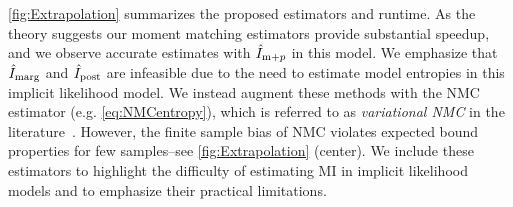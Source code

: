 \FIG\ref{fig:Extrapolation} summarizes the proposed estimators and
runtime.  As the theory suggests our moment matching estimators
provide substantial speedup, and we observe accurate estimates with
$\hat{I}_{\text{m}+p}$ in this model.  We emphasize that $\hat{I}_{\text{marg}}$ and $\hat{I}_{\text{post}}$ are
infeasible due to the need to estimate model entropies in this
implicit likelihood model.  We instead augment these methods with the
NMC estimator (e.g. \EQN\eqref{eq:NMCentropy}), which is referred to
as \emph{variational NMC} in the literature~\cite{Foster2019}.
However, the finite sample bias of NMC violates expected bound
properties for few samples--see \FIG\ref{fig:Extrapolation} (center).
We include these estimators to highlight the difficulty of estimating
MI in implicit likelihood models and to emphasize their practical
limitations.


